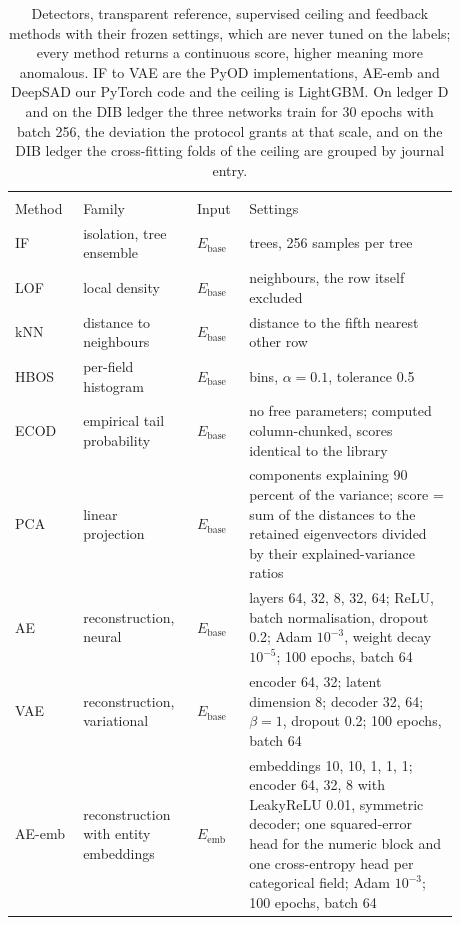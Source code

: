 \begin{table}[tbp]
\caption{Detectors, transparent reference, supervised ceiling and feedback methods with their frozen settings, which are never tuned on the labels; every method returns a continuous score, higher meaning more anomalous. IF to VAE are the PyOD implementations, AE-emb and DeepSAD our PyTorch code and the ceiling is LightGBM. On ledger D and on the DIB ledger the three networks train for 30 epochs with batch 256, the deviation the protocol grants at that scale, and on the DIB ledger the cross-fitting folds of the ceiling are grouped by journal entry.}
\label{tab:detectors}
\footnotesize
\setlength{\tabcolsep}{4pt}
\begin{tabular}{@{}>{\raggedright\arraybackslash}p{0.145\linewidth}>{\raggedright\arraybackslash}p{0.20\linewidth}>{\raggedright\arraybackslash}p{0.10\linewidth}>{\raggedright\arraybackslash}p{0.435\linewidth}@{}}
\toprule
\multicolumn{4}{@{}l}{\textit{(a) Detectors, the transparent reference and the supervised ceiling}} \\
\addlinespace
Method & Family & Input & Settings \\
\midrule
IF & isolation, tree ensemble & $E_{\mathrm{base}}$ & 200 trees, 256 samples per tree \\
LOF & local density & $E_{\mathrm{base}}$ & 20 neighbours, the row itself excluded \\
kNN & distance to neighbours & $E_{\mathrm{base}}$ & distance to the fifth nearest other row \\
HBOS & per-field histogram & $E_{\mathrm{base}}$ & 10 bins, $\alpha = 0.1$, tolerance 0.5 \\
ECOD & empirical tail probability & $E_{\mathrm{base}}$ & no free parameters; computed column-chunked, scores identical to the library \\
PCA & linear projection & $E_{\mathrm{base}}$ & components explaining 90 percent of the variance; score = sum of the distances to the retained eigenvectors divided by their explained-variance ratios \\
AE & reconstruction, neural & $E_{\mathrm{base}}$ & layers 64, 32, 8, 32, 64; ReLU, batch normalisation, dropout 0.2; Adam $10^{-3}$, weight decay $10^{-5}$; 100 epochs, batch 64 \\
VAE & reconstruction, variational & $E_{\mathrm{base}}$ & encoder 64, 32; latent dimension 8; decoder 32, 64; $\beta = 1$, dropout 0.2; 100 epochs, batch 64 \\
AE-emb & reconstruction with entity embeddings & $E_{\mathrm{emb}}$ & embeddings 10, 10, 1, 1, 1; encoder 64, 32, 8 with LeakyReLU 0.01, symmetric decoder; one squared-error head for the numeric block and one cross-entropy head per categorical field; Adam $10^{-3}$; 100 epochs, batch 64 \\

\end{tabular}
\end{table}
